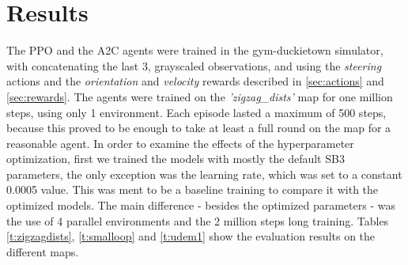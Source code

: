 \documentclass{article}
\begin{document}
\section{\large{Results}}
The PPO and the A2C agents were trained in the gym-duckietown simulator, with concatenating the last 3, grayscaled observations, and using the \textit{steering} actions and the \textit{orientation} and \textit{velocity} rewards described in \autoref{sec:actions} and \autoref{sec:rewards}. The agents were trained on the \textit{'zigzag\_dists'} map for one million steps, using only 1 environment. Each episode lasted a maximum of 500 steps, because this proved to be enough to take at least a full round on the map for a reasonable agent. 
In order to examine the effects of the hyperparameter optimization, first we trained the models with mostly the default SB3 parameters, the only exception was the learning rate, which was set to a constant 0.0005 value. This was ment to be a baseline training to compare it with the optimized models. The main difference - besides the optimized parameters - was the use of 4 parallel environments and the 2 million steps long training. 
Tables \ref{t:zigzagdists}, \ref{t:smalloop} and \ref{t:udem1} show the evaluation results on the different maps.
\end{document}
